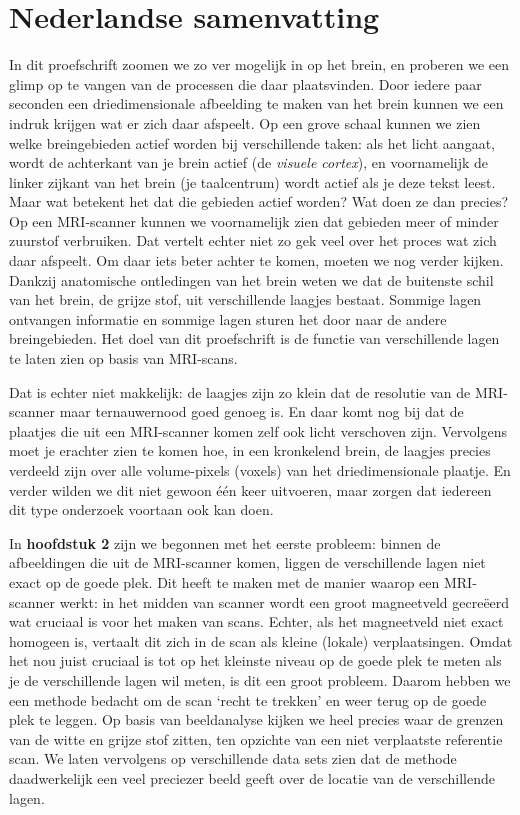 \section{Nederlandse samenvatting}
In dit proefschrift zoomen we zo ver mogelijk in op het brein, en proberen we een glimp op te vangen van de processen die daar plaatsvinden. Door iedere paar seconden een driedimensionale afbeelding te maken van het brein kunnen we een indruk krijgen wat er zich daar afspeelt. Op een grove schaal kunnen we zien welke breingebieden actief worden bij verschillende taken: als het licht aangaat, wordt de achterkant van je brein actief (de \emph{visuele cortex}), en voornamelijk de linker zijkant van het brein (je taalcentrum) wordt actief als je deze tekst leest. Maar wat betekent het dat die gebieden actief worden? Wat doen ze dan precies? Op een MRI-scanner kunnen we voornamelijk zien dat gebieden meer of minder zuurstof verbruiken. Dat vertelt echter niet zo gek veel over het proces wat zich daar afspeelt. Om daar iets beter achter te komen, moeten we nog verder kijken. Dankzij anatomische ontledingen van het brein weten we dat de buitenste schil van het brein, de grijze stof, uit verschillende laagjes bestaat. Sommige lagen ontvangen informatie en sommige lagen sturen het door naar de andere breingebieden. Het doel van dit proefschrift is de functie van verschillende lagen te laten zien op basis van MRI-scans.

Dat is echter niet makkelijk: de laagjes zijn zo klein dat de resolutie van de MRI-scanner maar ternauwernood goed genoeg is. En daar komt nog bij dat de plaatjes die uit een MRI-scanner komen zelf ook licht verschoven zijn. Vervolgens moet je erachter zien te komen hoe, in een kronkelend brein, de laagjes precies verdeeld zijn over alle volume-pixels (voxels) van het driedimensionale plaatje. En verder wilden we dit niet gewoon \'e\'en keer uitvoeren, maar zorgen dat iedereen dit type onderzoek voortaan ook kan doen.

In \textbf{hoofdstuk 2} zijn we begonnen met het eerste probleem: binnen de afbeeldingen die uit de MRI-scanner komen, liggen de verschillende lagen niet exact op de goede plek. Dit heeft te maken met de manier waarop een MRI-scanner werkt: in het midden van scanner wordt een groot magneetveld gecre\"eerd wat cruciaal is voor het maken van scans. Echter, als het magneetveld niet exact homogeen is, vertaalt dit zich in de scan als kleine (lokale) verplaatsingen. Omdat het nou juist cruciaal is tot op het kleinste niveau op de goede plek te meten als je de verschillende lagen wil meten, is dit een groot probleem. Daarom hebben we een methode bedacht om de scan `recht te trekken' en weer terug op de goede plek te leggen. Op basis van beeldanalyse kijken we heel precies waar de grenzen van de witte en grijze stof zitten, ten opzichte van een niet verplaatste referentie scan. We laten vervolgens op verschillende data sets zien dat de methode daadwerkelijk een veel preciezer beeld geeft over de locatie van de verschillende lagen. 

